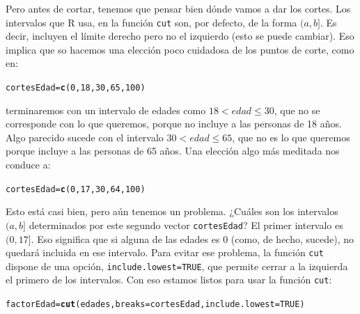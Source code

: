 \documentclass[10pt,a4paper]{article}\usepackage[]{graphicx}\usepackage[]{color}
\makeatletter
\newcommand{\hlnum}[1]{\textcolor[rgb]{0.686,0.059,0.569}{#1}}%
\newcommand{\hlstd}[1]{\textcolor[rgb]{0.345,0.345,0.345}{#1}}%
\newcommand{\hlkwb}[1]{\textcolor[rgb]{0.69,0.353,0.396}{#1}}%
\newcommand{\hlkwc}[1]{\textcolor[rgb]{0.333,0.667,0.333}{#1}}%
\newcommand{\hlkwd}[1]{\textcolor[rgb]{0.737,0.353,0.396}{\textbf{#1}}}%
\newenvironment{kframe}{%
 \def\at@end@of@kframe{}%
 \ifinner\ifhmode%
  \def\at@end@of@kframe{\end{minipage}}%
  \begin{minipage}{\columnwidth}%
 \fi\fi%
 \def\FrameCommand##1{\hskip\@totalleftmargin \hskip-\fboxsep
 \colorbox{shadecolor}{##1}\hskip-\fboxsep
     \hskip-\linewidth \hskip-\@totalleftmargin \hskip\columnwidth}%
 \MakeFramed {\advance\hsize-\width
   \@totalleftmargin\z@ \linewidth\hsize
   \@setminipage}}%
 {\par\unskip\endMakeFramed%
 \at@end@of@kframe}
\newenvironment{knitrout}{}{} %
\makeatother
\begin{document}
Pero antes de cortar, tenemos que pensar bien dónde vamos a dar los cortes. Los intervalos que R usa, en la función {\tt cut} son, por defecto, de la forma $(a,b]$. Es decir, incluyen el límite derecho pero no el izquierdo (esto se puede cambiar). Eso implica que so hacemos una elección poco cuidadosa de los puntos de corte, como en:
\begin{knitrout}
\color{fgcolor}\begin{kframe}
\begin{alltt}
\hlstd{cortesEdad} \hlkwb{=} \hlkwd{c}\hlstd{(}\hlnum{0}\hlstd{,} \hlnum{18}\hlstd{,} \hlnum{30}\hlstd{,} \hlnum{65}\hlstd{,} \hlnum{100}\hlstd{)}
\end{alltt}
\end{kframe}
\end{knitrout}
terminaremos con un intervalo de edades como $18< edad \leq 30$, que no se corresponde con lo que queremos, porque no incluye a las personas de 18 años. Algo parecido sucede con el intervalo $30 < edad \leq 65$, que no es lo que queremos porque incluye a las personas de 65 años. Una elección algo más meditada nos conduce a:
\begin{knitrout}
\color{fgcolor}\begin{kframe}
\begin{alltt}
\hlstd{cortesEdad} \hlkwb{=} \hlkwd{c}\hlstd{(}\hlnum{0}\hlstd{,} \hlnum{17}\hlstd{,} \hlnum{30}\hlstd{,} \hlnum{64}\hlstd{,} \hlnum{100}\hlstd{)}
\end{alltt}
\end{kframe}
\end{knitrout}
Esto está casi bien, pero aún tenemos un problema. ¿Cuáles son los intervalos $(a,b]$ determinados por este segundo vector {\tt cortesEdad}? El primer intervalo es $(0,17]$. Eso significa que si alguna de las edades es $0$ (como, de hecho, sucede), no quedará incluida en ese intervalo. Para evitar ese problema, la función {\tt cut} dispone de una opción, {\tt include.lowest=TRUE}, que permite cerrar a la izquierda el primero de los intervalos. Con eso estamos listos para usar la función {\tt cut}:

\begin{knitrout}
\color{fgcolor}\begin{kframe}
\begin{alltt}
\hlstd{factorEdad} \hlkwb{=} \hlkwd{cut}\hlstd{(edades,} \hlkwc{breaks}\hlstd{=cortesEdad,} \hlkwc{include.lowest}\hlstd{=}\hlnum{TRUE}\hlstd{)}
\end{alltt}
\end{kframe}
\end{knitrout}
\end{document}

